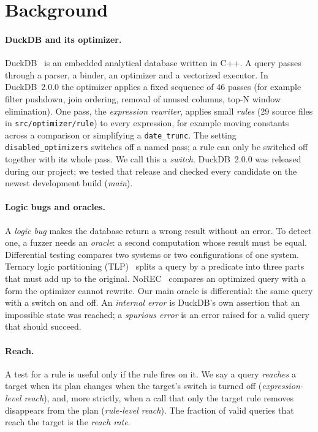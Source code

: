 \section{Background}
\label{sec:background}

\paragraph{DuckDB and its optimizer.} DuckDB~\cite{raasveldt2019duckdb} is an embedded analytical database written in
C++. A query passes through a parser, a binder, an optimizer and a vectorized executor. In DuckDB~2.0.0 the optimizer applies
a fixed sequence of 46 passes (for example filter pushdown, join ordering, removal of unused columns, top-N window
elimination). One pass, the \emph{expression rewriter}, applies small \emph{rules} (29 source files in
\texttt{src/optimizer/rule}) to every expression, for example
moving constants across a comparison or simplifying a \texttt{date\_trunc}. The setting
\texttt{disabled\_optimizers} switches off a named pass; a rule can only be switched off together with its whole pass.
We call this a \emph{switch}. DuckDB~2.0.0 was released during our project; we tested that release and checked every
candidate on the newest development build (\emph{main}).

\paragraph{Logic bugs and oracles.} A \emph{logic bug} makes the database return a wrong result without an error. To
detect one, a fuzzer needs an \emph{oracle}: a second computation whose result must be equal. Differential testing
compares two systems or two configurations of one system. Ternary logic partitioning (TLP)~\cite{rigger2020tlp} splits a
query by a predicate into three parts that must add up to the original. NoREC~\cite{rigger2020norec} compares an
optimized query with a form the optimizer cannot rewrite. Our main oracle is differential: the same query with a switch on
and off. An \emph{internal error} is DuckDB's own assertion that an impossible state was reached; a \emph{spurious error}
is an error raised for a valid query that should succeed.

\paragraph{Reach.} A test for a rule is useful only if the rule fires on it. We say a query \emph{reaches} a target
when its plan changes when the target's switch is turned off (\emph{expression-level reach}), and, more strictly, when a
call that only the target rule removes disappears from the plan (\emph{rule-level reach}). The fraction of valid queries
that reach the target is the \emph{reach rate}.

